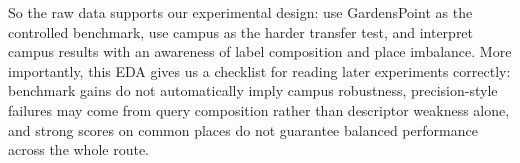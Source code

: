 \documentclass[11pt]{article}
\begin{document}
So the raw data supports our experimental design: use GardensPoint as the controlled benchmark, use campus as the harder transfer test, and interpret campus results with an awareness of label composition and place imbalance. More importantly, this EDA gives us a checklist for reading later experiments correctly: benchmark gains do not automatically imply campus robustness, precision-style failures may come from query composition rather than descriptor weakness alone, and strong scores on common places do not guarantee balanced performance across the whole route.
\end{document}
